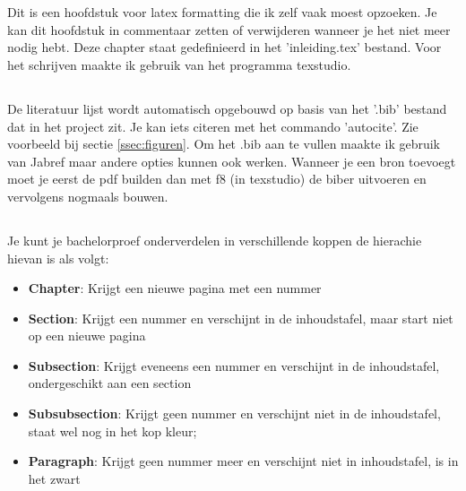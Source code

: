 \chapter{}%
\label{ch:lt}

Dit is een hoofdstuk voor latex formatting die ik zelf vaak moest opzoeken. Je kan dit hoofdstuk in commentaar zetten of verwijderen wanneer je het niet meer nodig hebt. Deze chapter staat gedefinieerd in het 'inleiding.tex' bestand. Voor het schrijven maakte ik gebruik van het programma texstudio.

\section{}%
\label{sec:citeren}

De literatuur lijst wordt automatisch opgebouwd op basis van het '.bib' bestand dat in het project zit. Je kan iets citeren met het commando 'autocite'. Zie voorbeeld bij sectie \ref{ssec:figuren}. Om het .bib aan te vullen maakte ik gebruik van Jabref maar andere opties kunnen ook werken. Wanneer je een bron toevoegt moet je eerst de pdf builden dan met f8 (in texstudio) de biber uitvoeren en vervolgens nogmaals bouwen.

\section{}%
\label{sec:koppen}

Je kunt je bachelorproef onderverdelen in verschillende koppen de hierachie hievan is als volgt:

\begin{itemize}[]
    \item \textbf{Chapter}: Krijgt een nieuwe pagina met een nummer
    \item \textbf{Section}: Krijgt een nummer en verschijnt in de inhoudstafel, maar start niet op een nieuwe pagina
    \item \textbf{Subsection}: Krijgt eveneens een nummer en verschijnt in de inhoudstafel, ondergeschikt aan een section
    \item \textbf{Subsubsection}: Krijgt geen nummer en verschijnt niet in de inhoudstafel, staat wel nog in het kop kleur;
    \item \textbf{Paragraph}: Krijgt geen nummer meer en verschijnt niet in inhoudstafel, is in het zwart
\end{itemize}

